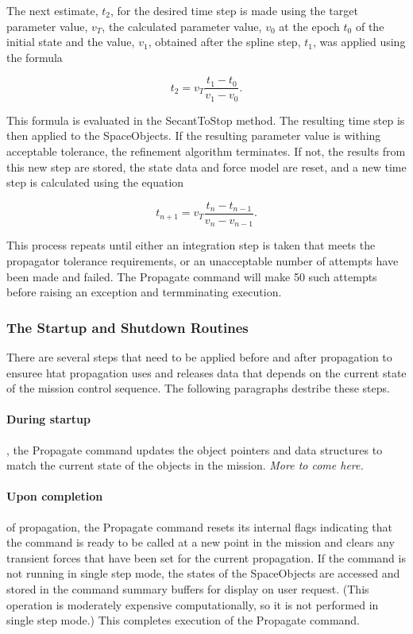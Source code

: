 The next estimate, $t_2$, for the desired time step is made using the target parameter value,
$v_T$, the calculated parameter value, $v_0$ at the epoch $t_0$ of the initial state and the value,
$v_1$, obtained after the spline step, $t_1$, was applied using the formula

\begin{equation}
t_2 = v_T \frac{t_1-t_0}{v_1-v_0}.
\end{equation}

\noindent This formula is evaluated in the SecantToStop method.  The resulting time step is then
applied to the SpaceObjects.  If the resulting parameter value is withing acceptable tolerance, the
refinement algorithm terminates.  If not, the results from this new step are stored, the state data
and force model are reset, and a new time step is calculated using the equation

\begin{equation}
t_{n+1} = v_T \frac{t_n-t_{n-1}}{v_n-v_{n-1}}.
\end{equation}

\noindent This process repeats until either an integration step is taken that meets the propagator
tolerance requirements, or an unacceptable number of attempts have been made and failed.  The
Propagate command will make 50 such attempts before raising an exception and termminating execution.

\subsubsection{The Startup and Shutdown Routines}

There are several steps that need to be applied before and after propagation to ensuree htat
propagation uses and releases data that depends on the current state of the mission control
sequence.  The following paragraphs destribe these steps.

\paragraph{During startup}, the Propagate command updates the object pointers and data structures to
match the current state of the objects in the mission.  \textit{More to come here.}

\paragraph{Upon completion} of propagation, the Propagate command resets its internal flags
indicating that the command is ready to be called at a new point in the mission and clears any
transient forces that have been set for the current propagation.  If the command is not running in
single step mode, the states of the SpaceObjects are accessed and stored in the command summary
buffers for display on user request.  (This operation is moderately expensive computationally, so it
is not performed in single step mode.)  This completes execution of the Propagate command.

